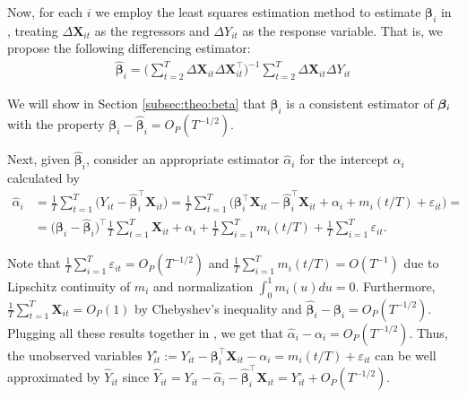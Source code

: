 \documentclass[a4paper,12pt]{article}
\makeatletter
\renewcommand{\eqref}[1]{\tagform@{\ref{#1}}}
\makeatother
\begin{document}
Now, for each $i$ we employ the least squares estimation method to estimate $\bm{\beta}_i$ in \eqref{model_with_regs}, treating $\Delta \mathbf{X}_{it}$ as the regressors and $\Delta Y_{it}$ as the response variable. That is, we propose the following differencing estimator:
\begin{align}\label{eq:beta:est}
\widehat{\bm{\beta}}_i = \Big( \sum_{t=2}^T \Delta \mathbf{X}_{it} \Delta \mathbf{X}_{it}^\top \Big)^{-1} \sum_{t=2}^T \Delta \mathbf{X}_{it} \Delta Y_{it}
\end{align}

We will show in Section \ref{subsec:theo:beta} that $\widehat{\bm{\beta}}_i$ is a consistent estimator of $\bm{\beta}_i$ with the property $\bm{\beta}_i - \widehat{\bm{\beta}}_i = O_P(T^{-1/2})$.

Next, given $\widehat{\bm{\beta}}_i$, consider an appropriate estimator $\widehat{\alpha}_{i}$ for the intercept $\alpha_i$ calculated by
\begin{align}\label{alpha-est}
\widehat{\alpha}_i &= \frac{1}{T}\sum_{t=1}^T \big(Y_{it} - \widehat{\bm{\beta}}_i^\top \mathbf{X}_{it}\big) = \frac{1}{T}\sum_{t=1}^T \big(\bm{\beta}_i^\top \mathbf{X}_{it} - \widehat{\bm{\beta}}_i^\top \mathbf{X}_{it} + \alpha_i + m_i(t/T) + \varepsilon_{it}\big) =\\
&= \big(\bm{\beta}_i - \widehat{\bm{\beta}}_i \big)^\top\frac{1}{T}\sum_{t=1}^T  \mathbf{X}_{it} + \alpha_i + \frac{1}{T}\sum_{i=1}^T m_i(t/T) + \frac{1}{T}\sum_{i=1}^T \varepsilon_{it}.\nonumber
\end{align}

Note that $\frac{1}{T}\sum_{i=1}^T \varepsilon_{it} = O_P(T^{-1/2})$ and $\frac{1}{T}\sum_{i=1}^T m_i(t/T) = O(T^{-1})$ due to Lipschitz continuity of $m_i$ and normalization $\int_{0}^1 m_i(u)du = 0$. Furthermore, $\frac{1}{T}\sum_{t=1}^T  \mathbf{X}_{it} = O_P(1)$ by Chebyshev's inequality and $\widehat{\bm{\beta}}_i - \bm{\beta}_i = O_P (T^{-1/2})$. Plugging all these results together in \eqref{alpha-est}, we get that $\widehat{\alpha}_i - \alpha_i = O_P(T^{-1/2})$. Thus, the unobserved variables \linebreak $Y_{it}^\circ := Y_{it} - \bm{\beta}_i^\top \mathbf{X}_{it} - \alpha_i = m_i(t/T) + \varepsilon_{it}$ can be well approximated by $\widehat{Y}_{it} $ since $\widehat{Y}_{it} = Y_{it} -\widehat{\alpha}_i - \widehat{\bm{\beta}}_i^\top \mathbf{X}_{it} = Y_{it}^\circ + O_P(T^{-1/2})$.
\end{document}
